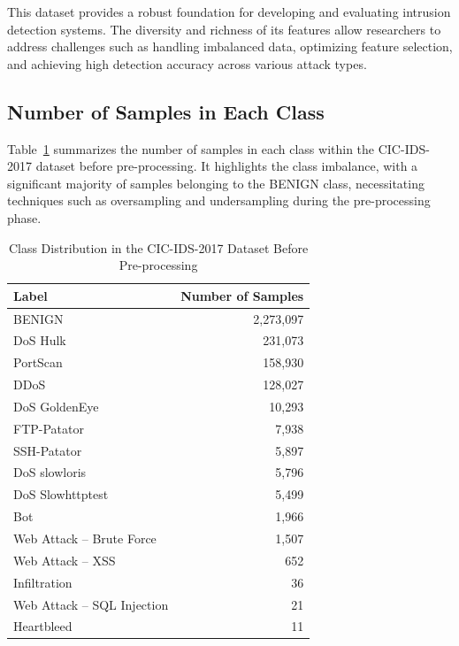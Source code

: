 \documentclass[conference]{IEEEtran}
\begin{document}
This dataset provides a robust foundation for developing and evaluating intrusion detection systems. The diversity and richness of its features allow researchers to address challenges such as handling imbalanced data, optimizing feature selection, and achieving high detection accuracy across various attack types.

\subsection{Number of Samples in Each Class}
Table~\ref{tab:class_distribution} summarizes the number of samples in each class within the CIC-IDS-2017 dataset before pre-processing. It highlights the class imbalance, with a significant majority of samples belonging to the BENIGN class, necessitating techniques such as oversampling and undersampling during the pre-processing phase.

\begin{table}[ht]
\centering
\caption{Class Distribution in the CIC-IDS-2017 Dataset Before Pre-processing}
\label{tab:class_distribution}
\begin{tabular}{|l|r|}
\hline
\textbf{Label}                     & \textbf{Number of Samples} \\ \hline
BENIGN                             & 2,273,097                 \\ \hline
DoS Hulk                           & 231,073                   \\ \hline
PortScan                           & 158,930                   \\ \hline
DDoS                               & 128,027                   \\ \hline
DoS GoldenEye                      & 10,293                    \\ \hline
FTP-Patator                        & 7,938                     \\ \hline
SSH-Patator                        & 5,897                     \\ \hline
DoS slowloris                      & 5,796                     \\ \hline
DoS Slowhttptest                   & 5,499                     \\ \hline
Bot                                & 1,966                     \\ \hline
Web Attack – Brute Force           & 1,507                     \\ \hline
Web Attack – XSS                   & 652                       \\ \hline
Infiltration                       & 36                        \\ \hline
Web Attack – SQL Injection         & 21                        \\ \hline
Heartbleed                         & 11                        \\ \hline
\end{tabular}
\end{table}
\end{document}
